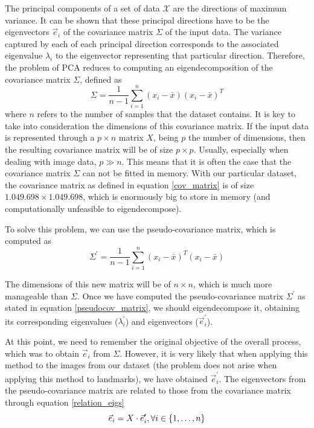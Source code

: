\documentclass{article}
\begin{document}
The principal components of a set of data $\mathcal{X}$ are the directions of maximum variance. It can be shown that these principal directions have to be the eigenvectors $\vec{e}_i$ of the covariance matrix $\Sigma$ of the input data. The variance captured by each of each principal direction corresponds to the associated eigenvalue $\lambda_i$ to the eigenvector representing that particular direction. Therefore, the problem of PCA reduces to computing an eigendecomposition of the covariance matrix $\Sigma$, defined as
\begin{equation}\label{cov_matrix}
    \Sigma = \frac{1}{n-1} \sum_{i = 1}^n (x_i - \bar{x})(x_i - \bar{x})^T
\end{equation}
where $n$ refers to the number of samples that the dataset contains. It is key to take into consideration the dimensions of this covariance matrix. If the input data is represented through a $p\times n$ matrix $X$, being $p$ the number of dimensions, then the resulting covariance matrix will be of size $p \times p$. Usually, especially when dealing with image data, $p \gg n$. This means that it is often the case that the covariance matrix $\Sigma$ can not be fitted in memory. With our particular dataset, the covariance matrix as defined in equation \ref{cov_matrix} is of size $1.049.698 \times 1.049.698$, which is enormously big to store in memory (and computationally unfeasible to eigendecompose).

To solve this problem, we can use the pseudo-covariance matrix, which is computed as
\begin{equation}\label{pseudocov_matrix}
    \Sigma^\prime = \frac{1}{n-1} \sum_{i = 1}^n (x_i - \bar{x})^T(x_i - \bar{x})
\end{equation}

The dimensions of this new matrix will be of $n \times n$, which is much more manageable than $\Sigma$. Once we have computed the pseudo-covariance matrix $\Sigma ^\prime$ as stated in equation \ref{pseudocov_matrix}, we should eigendecompose it, obtaining its corresponding eigenvalues ($\lambda_i^\prime$) and eigenvectors ($\vec{e}_i^\prime$).

At this point, we need to remember the original objective of the overall process, which was to obtain $\vec{e}_i$ from $\Sigma$. However, it is very likely that when applying this method to the images from our dataset (the problem does not arise when applying this method to landmarks), we have obtained $\vec{e}_i^\prime$. The eigenvectors from the pseudo-covariance matrix are related to those from the covariance matrix through equation \ref{relation_eigs}
\begin{equation}\label{relation_eigs}
    \vec{e}_i = X \cdot \vec{e}_i^\prime , \space \forall i \in \{1, \dots , n\}
\end{equation}
\end{document}
